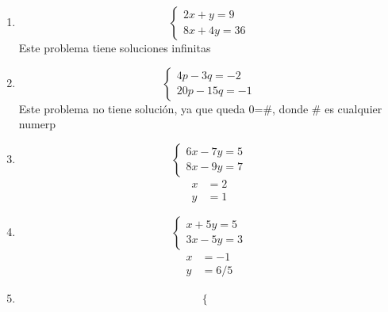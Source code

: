 \documentclass[12pt,letterpaper]{report}
\begin{document}
\begin{enumerate}
\begin{equation*}
        \left\lbrace \begin{matrix}
             12u-16v=24\\
             3u-4v=6
        \end{matrix} \right.
    \end{equation*}
    Este problema tiene soluciones infinitas, ya que resulta por cualquier método que 0=0
    \item\begin{equation*}
        \left\lbrace \begin{matrix}
             2x+y=9\\
             8x+4y=36
        \end{matrix} \right.
    \end{equation*}
    Este problema tiene soluciones infinitas
    \item\begin{equation*}
        \left\lbrace \begin{matrix}
             4p-3q=-2\\
             20p-15q=-1
        \end{matrix} \right.
    \end{equation*}
    Este problema no tiene solución, ya que queda 0=\#, donde \# es cualquier numerp
    \item\begin{equation*}
        \left\lbrace \begin{matrix}
             6x-7y=5\\
             8x-9y=7
        \end{matrix} \right.
    \end{equation*}\begin{align*}
        x&=2\\
        y&=1
    \end{align*}
    \item\begin{equation*}
        \left\lbrace \begin{matrix}
             x+5y=5\\
             3x-5y=3
        \end{matrix} \right.
    \end{equation*}\begin{align*}
        x&=-1\\
        y&=6/5
    \end{align*}
    \item\begin{equation*}
        \left\lbrace \begin{matrix}

\end{matrix}
\end{equation*}
\end{enumerate}
\end{document}
